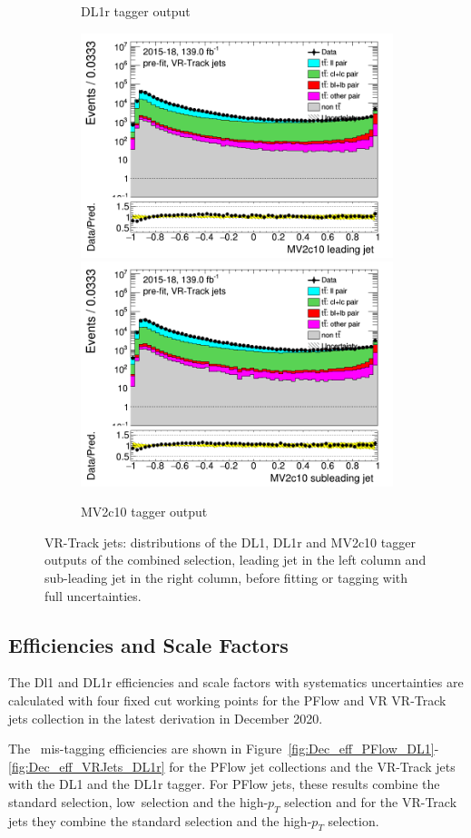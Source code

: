 \begin{figure}[H]
\begin{subfigure}[t]{1\linewidth}
	\caption{DL1r tagger output}
	\end{subfigure}
	\begin{subfigure}[t]{1\linewidth}
	\includegraphics[width=.45\textwidth]{FTAG_plots/pretagNoRwwithhighpTVRJetsall/DataMC_h_J0_MV2c10_Fulltrackjet_log.png}
	\includegraphics[width=.45\textwidth]{FTAG_plots/pretagNoRwwithhighpTVRJetsall/DataMC_h_J1_MV2c10_Fulltrackjet_log.png}\\
	\caption{MV2c10 tagger output}
	\end{subfigure}
	\caption{VR-Track jets: distributions of the DL1, DL1r and MV2c10 tagger outputs of 
	the combined selection, 
	leading jet in the left column and sub-leading jet in the right column,
	before fitting or tagging with full uncertainties.} \label{fig:taggers_VRJets}
\end{figure}	

\subsection{Efficiencies and Scale Factors}
The Dl1 and DL1r \cjet efficiencies and scale factors with systematics 
uncertainties are calculated with four fixed cut working points 
for the PFlow and VR VR-Track jets collection in the latest derivation 
in December 2020.

The \cjet\ mis-tagging efficiencies are shown in Figure~\ref{fig:Dec_eff_PFlow_DL1}-\ref{fig:Dec_eff_VRJets_DL1r} 
for the PFlow jet collections and the VR-Track jets with the DL1 and the DL1r tagger. 
For PFlow jets, these results combine the standard selection, low\pt\ selection and the high-$p_T$ selection 
and for the VR-Track jets they combine the standard selection and the high-$p_T$ selection. 


